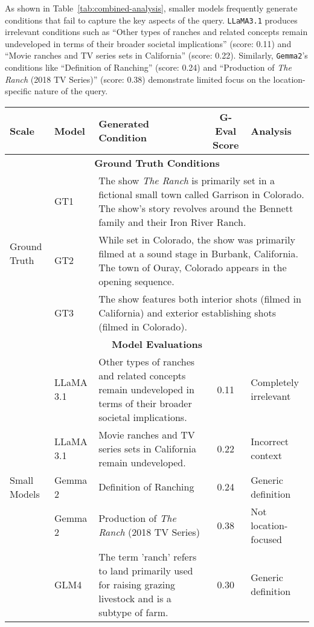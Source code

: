 As shown in Table~\ref{tab:combined-analysis}, smaller models frequently generate conditions that fail to capture the key aspects of the query. \texttt{LLaMA3.1} produces irrelevant conditions such as ``Other types of ranches and related concepts remain undeveloped in terms of their broader societal implications'' (score: 0.11) and ``Movie ranches and TV series sets in California'' (score: 0.22). Similarly, \texttt{Gemma2}'s conditions like ``Definition of Ranching'' (score: 0.24) and ``Production of \textit{The Ranch} (2018 TV Series)'' (score: 0.38) demonstrate limited focus on the location-specific nature of the query.
\begin{table}[htbp]
\centering
\begin{tabular}{|l|l|p{6cm}|c|l|}
\hline
\textbf{Scale} & \textbf{Model} & \textbf{Generated Condition} & \textbf{G-Eval Score} & \textbf{Analysis} \\
\hline
\multicolumn{5}{|c|}{\textbf{Ground Truth Conditions}} \\
\hline
\multirow{3}{*}{Ground Truth} & GT1 & \multicolumn{3}{p{9cm}|}{The show \textit{The Ranch} is primarily set in a fictional small town called Garrison in Colorado. The show's story revolves around the Bennett family and their Iron River Ranch.} \\
\cline{2-5}
& GT2 & \multicolumn{3}{p{9cm}|}{While set in Colorado, the show was primarily filmed at a sound stage in Burbank, California. The town of Ouray, Colorado appears in the opening sequence.} \\
\cline{2-5}
& GT3 & \multicolumn{3}{p{9cm}|}{The show features both interior shots (filmed in California) and exterior establishing shots (filmed in Colorado).} \\
\hline
\multicolumn{5}{|c|}{\textbf{Model Evaluations}} \\
\hline
\multirow{8}{*}{Small Models} & LLaMA 3.1 & Other types of ranches and related concepts remain undeveloped in terms of their broader societal implications. & 0.11 & Completely irrelevant \\
\cline{2-5}
& LLaMA 3.1 & Movie ranches and TV series sets in California remain undeveloped.  & 0.22 & Incorrect context \\
\cline{2-5}
& Gemma 2 & Definition of Ranching & 0.24 & Generic definition \\
\cline{2-5}
& Gemma 2 & Production of \textit{The Ranch} (2018 TV Series) & 0.38 & Not location-focused \\
\cline{2-5}
& GLM4 & The term 'ranch' refers to land primarily used for raising grazing livestock and is a subtype of farm.  & 0.30 & Generic definition \\

\end{tabular}
\end{table}
